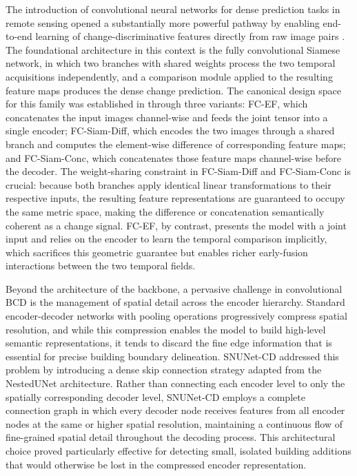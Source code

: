 The introduction of convolutional neural networks for dense prediction tasks in remote sensing opened a substantially more powerful pathway by enabling end-to-end learning of change-discriminative features directly from raw image pairs \cite{Shafique2022Review}. The foundational architecture in this context is the fully convolutional Siamese network, in which two branches with shared weights process the two temporal acquisitions independently, and a comparison module applied to the resulting feature maps produces the dense change prediction. The canonical design space for this family was established in \cite{Daudt2018SiamICIP} through three variants: FC-EF, which concatenates the input images channel-wise and feeds the joint tensor into a single encoder; FC-Siam-Diff, which encodes the two images through a shared branch and computes the element-wise difference of corresponding feature maps; and FC-Siam-Conc, which concatenates those feature maps channel-wise before the decoder. The weight-sharing constraint in FC-Siam-Diff and FC-Siam-Conc is crucial: because both branches apply identical linear transformations to their respective inputs, the resulting feature representations are guaranteed to occupy the same metric space, making the difference or concatenation semantically coherent as a change signal. FC-EF, by contrast, presents the model with a joint input and relies on the encoder to learn the temporal comparison implicitly, which sacrifices this geometric guarantee but enables richer early-fusion interactions between the two temporal fields.

Beyond the architecture of the backbone, a pervasive challenge in convolutional \ac{BCD} is the management of spatial detail across the encoder hierarchy. Standard encoder-decoder networks with pooling operations progressively compress spatial resolution, and while this compression enables the model to build high-level semantic representations, it tends to discard the fine edge information that is essential for precise building boundary delineation. SNUNet-CD \cite{Fang2021SNUNetCD} addressed this problem by introducing a dense skip connection strategy adapted from the NestedUNet architecture. Rather than connecting each encoder level to only the spatially corresponding decoder level, SNUNet-CD employs a complete connection graph in which every decoder node receives features from all encoder nodes at the same or higher spatial resolution, maintaining a continuous flow of fine-grained spatial detail throughout the decoding process. This architectural choice proved particularly effective for detecting small, isolated building additions that would otherwise be lost in the compressed encoder representation.

